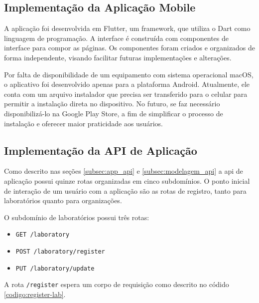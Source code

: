 \subsection{Implementação da Aplicação Mobile}\label{subsec:aplicacao}

A aplicação foi desenvolvida em Flutter, um framework, que utiliza o Dart como linguagem de programação. A interface é construída com componentes de interface para compor as páginas. Os componentes foram criados e organizados de forma independente, visando facilitar futuras implementações e alterações.

Por falta de disponibilidade de um equipamento com sistema operacional macOS, o aplicativo foi desenvolvido apenas para a plataforma Android. Atualmente, ele conta com um arquivo instalador que precisa ser transferido para o celular para permitir a instalação direta no dispositivo. No futuro, se faz necessário disponibilizá-lo na Google Play Store, a fim de simplificar o processo de instalação e oferecer maior praticidade aos usuários.

\subsection{Implementação da API de Aplicação}\label{subsec:api-aplicacao}

Como descrito nas seções \ref{subsec:app_api} e \ref{subsec:modelagem_api} a \gls{api} de aplicação possui quinze rotas organizadas em cinco subdomínios. O ponto inicial de interação de um usuário com a aplicação são as rotas de registro, tanto para laboratórios quanto para organizações.

O subdomínio de laboratórios possui três rotas:

\begin{itemize}
  \item \texttt{GET /laboratory}
  \item \texttt{POST /laboratory/register}
  \item \texttt{PUT /laboratory/update}
\end{itemize}

A rota \texttt{/register} espera um corpo de requisição como descrito no códido \ref{codigo:register-lab}.

